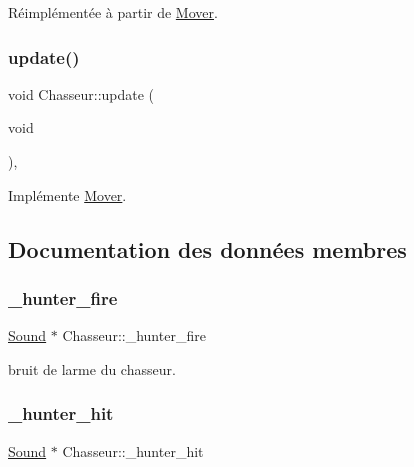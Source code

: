 Réimplémentée à partir de \hyperlink{classMover_ac32ed126c01d60c6df0090dd590b70b2}{Mover}.

\mbox{\label{classChasseur_a6ea64de0a2708b21326dcb980f0e06ac}} 
\subsubsection{\texorpdfstring{update()}{update()}}
{\footnotesize\ttfamily void Chasseur\+::update (\begin{DoxyParamCaption}\item[{void}]{ }\end{DoxyParamCaption})\hspace{0.3cm}{\ttfamily [inline]}, {\ttfamily [virtual]}}



Implémente \hyperlink{classMover_a77684ae3483af98c82c9488ef3e80f05}{Mover}.



\subsection{Documentation des données membres}
\mbox{\label{classChasseur_aec2e8b81e3f949dc7840bfcab9c3799a}} 
\subsubsection{\texorpdfstring{\+\_\+hunter\+\_\+fire}{\_hunter\_fire}}
{\footnotesize\ttfamily \hyperlink{classSound}{Sound} $\ast$ Chasseur\+::\+\_\+hunter\+\_\+fire\hspace{0.3cm}{\ttfamily [static]}}



bruit de l\textquotesingle{}arme du chasseur. 

\mbox{\label{classChasseur_ab468d04c50ea338d604e87d5f6db3801}} 
\subsubsection{\texorpdfstring{\+\_\+hunter\+\_\+hit}{\_hunter\_hit}}
{\footnotesize\ttfamily \hyperlink{classSound}{Sound} $\ast$ Chasseur\+::\+\_\+hunter\+\_\+hit\hspace{0.3cm}{\ttfamily [static]}}



